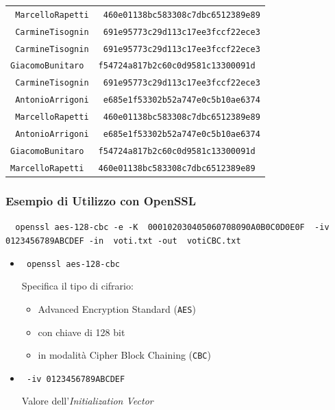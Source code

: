 \documentclass[]{beamer}
\begin{document}
{\begin{frame}
{\begin{tabular}{|p{3.5cm}||p{7.0cm}|}
{\tt \color{blue} MarcelloRapetti} &
{\tt \color{blue} 460e01138bc583308c7dbc6512389e89} \\
{\tt \color{green} CarmineTisognin} &
{\tt \color{green} 691e95773c29d113c17ee3fccf22ece3} \\
{\tt \color{green} CarmineTisognin} &
{\tt \color{green} 691e95773c29d113c17ee3fccf22ece3} \\
{\tt GiacomoBunitaro} &
{\tt f54724a817b2c60c0d9581c13300091d} \\
{\tt \color{green} CarmineTisognin} &
{\tt \color{green} 691e95773c29d113c17ee3fccf22ece3} \\
{\tt \color{red} AntonioArrigoni} &
{\tt \color{red} e685e1f53302b52a747e0c5b10ae6374} \\
{\tt \color{blue} MarcelloRapetti} &
{\tt \color{blue} 460e01138bc583308c7dbc6512389e89} \\
{\tt \color{red} AntonioArrigoni} &
{\tt \color{red} e685e1f53302b52a747e0c5b10ae6374} \\
{\tt GiacomoBunitaro} &
{\tt f54724a817b2c60c0d9581c13300091d} \\
{\tt MarcelloRapetti} &
{\tt 460e01138bc583308c7dbc6512389e89}\\ \hline
\end{tabular}
}
\end{frame}


\begin{frame}
\frametitle{Esempio di Utilizzo con OpenSSL}
{\small 
{\tt
{\color{magenta} openssl aes-128-cbc} -e -K {\color{blue} 000102030405060708090A0B0C0D0E0F} {\color{purple} -iv 0123456789ABCDEF} -in {\color{red} voti.txt} -out {\color{red} votiCBC.txt}
}}

\begin{itemize}
\item<2-> {\tt \color{magenta} openssl aes-128-cbc} 

Specifica il tipo di cifrario: 

\begin{itemize}
\item Advanced Encryption Standard ({\tt AES}) 
\item con chiave di 128 bit
\item in modalit\`a Cipher Block Chaining ({\tt CBC})
\end{itemize}
\item<3-> {\tt \color{purple} -iv 0123456789ABCDEF}

Valore dell'{\em Initialization Vector}
\end{itemize}
\end{frame}
}
\end{document}
